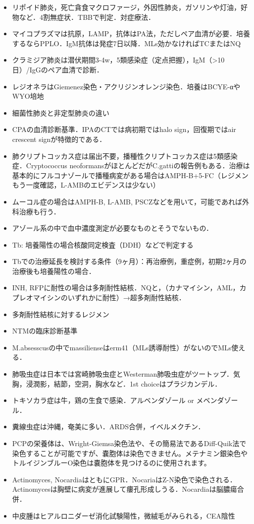 \begin{itemize}

\item リポイド肺炎，死亡貪食マクロファージ，外因性肺炎，ガソリンや灯油，好物など．4割無症状．TBBで判定．対症療法．
\item マイコプラズマは抗原，LAMP，抗体はPA法，ただしペア血清が必要．培養するならPPLO．IgM抗体は発症7日以降．MLs効かなければTCまたはNQ
\item クラミジア肺炎は潜伏期間3-4w，5類感染症（定点把握），IgM（>10日）/IgGのペア血清で診断．
\item レジオネラはGiemenez染色・アクリジンオレンジ染色．培養はBCYE-αやWYO培地

\item 細菌性肺炎と非定型肺炎の違い
\item CPAの血清診断基準．IPAのCTでは病初期ではhalo sign，回復期ではair crescent signが特徴的である．
\item 肺クリプトコッカス症は届出不要，播種性クリプトコッカス症は5類感染症．Cryptococcus neoformansがほとんどだがC.gattiの報告例もある．治療は基本的にフルコナゾールで播種病変がある場合はAMPH-B+5-FC（レジメンもう一度確認，L-AMBのエビデンスは少ない）
\item ムーコル症の場合はAMPH-B, L-AMB, PSCZなどを用いて，可能であれば外科治療も行う．
\item アゾール系の中で血中濃度測定が必要なものとそうでないもの．

\item Tb: 培養陽性の場合核酸同定検査（DDH）などで判定する
\item Tbでの治療延長を検討する条件（9ヶ月）：再治療例，重症例，初期2ヶ月の治療後も培養陽性の場合．
\item INH, RFPに耐性の場合は多剤耐性結核．NQと，（カナマイシン，AML，カプレオマイシンのいずれかに耐性）→超多剤耐性結核．
\item 多剤耐性結核に対するレジメン
\item NTMの臨床診断基準
\item M.absesscusの中でmassilienseはerm41（MLs誘導耐性）がないのでMLs使える．

\item 肺吸虫症は日本では宮崎肺吸虫症とWesterman肺吸虫症がツートップ．気胸，浸潤影，結節，空洞，胸水など．1st choiceはプラジカンデル．
\item トキソカラ症は牛，鶏の生食で感染．アルベンダゾール or メベンダゾール．
\item 糞線虫症は沖縄，奄美に多い．ARDS合併，イベルメクチン．

\item PCPの栄養体は、Wright-Giemsa染色法や、その簡易法であるDiff-Quik法で染色することが可能ですが、嚢胞体は染色できません。メテナミン銀染色やトルイジンブルーO染色は嚢胞体を見つけるのに使用されます。

\item Actinomyces, NocardiaはともにGPR．NocariaはZ-N染色で染色される．Actinomycesは胸壁に病変が進展して瘻孔形成しうる．Nocardiaは脳膿瘍合併．


\item 中皮腫はヒアルロニダーゼ消化試験陽性，微絨毛がみられる，CEA陰性


\end{itemize}
